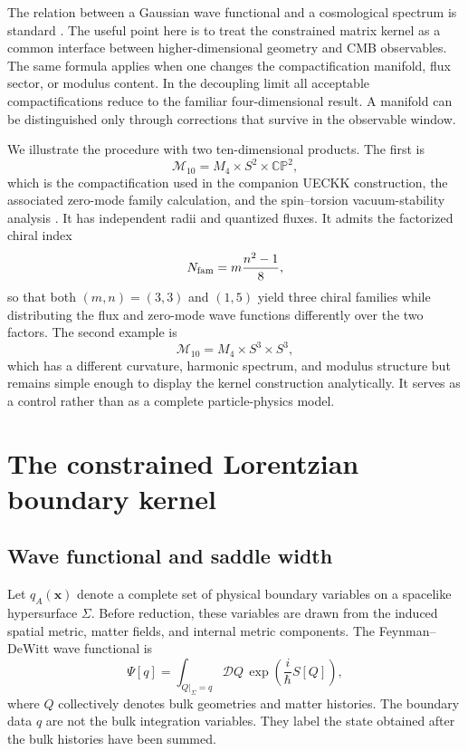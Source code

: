 \documentclass[aps,prd,twocolumn,superscriptaddress,nofootinbib,longbibliography,floatfix]{revtex4-2}
\newcommand{\cM}{\mathcal M}
\newcommand{\CP}{\mathbb{CP}}
\begin{document}
The relation between a Gaussian wave functional and a cosmological spectrum is standard \cite{HalliwellHawking1985,PolarskiStarobinsky1996,Maldacena2003}. The useful point here is to treat the constrained matrix kernel as a common interface between higher-dimensional geometry and CMB observables. The same formula applies when one changes the compactification manifold, flux sector, or modulus content. In the decoupling limit all acceptable compactifications reduce to the familiar four-dimensional result. A manifold can be distinguished only through corrections that survive in the observable window.

We illustrate the procedure with two ten-dimensional products. The first is
\begin{equation}
\cM_{10}=M_4\times S^2\times\CP^2,
\end{equation}
which is the compactification used in the companion UECKK construction, the associated zero-mode family calculation, and the spin--torsion vacuum-stability analysis \cite{ShayaUECKK2026,ShayaZeroModes2026,ShayaVacuum2026}. It has independent radii and quantized fluxes. It admits the factorized chiral index
\begin{equation}
N_{\rm fam}=m\frac{n^2-1}{8},
\end{equation}
so that both $(m,n)=(3,3)$ and $(1,5)$ yield three chiral families while distributing the flux and zero-mode wave functions differently over the two factors. The second example is
\begin{equation}
\cM_{10}=M_4\times S^3\times S^3,
\end{equation}
which has a different curvature, harmonic spectrum, and modulus structure but remains simple enough to display the kernel construction analytically. It serves as a control rather than as a complete particle-physics model.

\section{The constrained Lorentzian boundary kernel}
\label{sec:kernel}

\subsection{Wave functional and saddle width}
Let $q_A(\bm x)$ denote a complete set of physical boundary variables on a spacelike hypersurface $\Sigma$. Before reduction, these variables are drawn from the induced spatial metric, matter fields, and internal metric components. The Feynman--DeWitt wave functional is
\begin{equation}
\Psi[q]=\int_{Q|_\Sigma=q}\mathcal DQ\,
\exp\left(\frac{i}{\hbar}S[Q]\right),
\end{equation}
where $Q$ collectively denotes bulk geometries and matter histories. The boundary data $q$ are not the bulk integration variables. They label the state obtained after the bulk histories have been summed.
\end{document}
